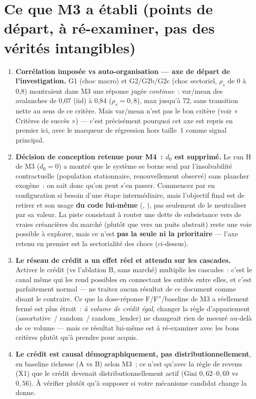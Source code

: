 \section*{Ce que M3 a établi (points de départ, à ré-examiner, pas des
vérités intangibles)}

\begin{enumerate}[leftmargin=*]

\item \textbf{Corrélation imposée vs auto-organisation — axe de départ de
  l'investigation.} G1 (choc macro) et G2/G2b/G2c (choc sectoriel, $\rho_s$
  de 0 à 0,8) montraient dans M3 une réponse jugée \emph{continue}~: var/mean
  des avalanches de 0,07 (iid) à 0,84 ($\rho_s{=}0{,}8$), max jusqu'à 72,
  sans transition nette au sens de ce critère. Mais var/mean n'est pas le
  bon critère (voir « Critères de succès ») — c'est précisément pourquoi cet
  axe est repris en premier ici, avec le marqueur de régression hors
  taille~1 comme signal principal.

\item \textbf{Décision de conception retenue pour M4~: $d_0$ est supprimé.}
  Le run H de M3 ($d_0{=}0$) a montré que le système se borne seul par
  l'insolvabilité contractuelle (population stationnaire, renouvellement
  observé) sans plancher exogène~: on sait donc qu'on peut s'en passer.
  Commencez par  en configuration si besoin d'une étape
  intermédiaire, mais l'objectif final est de retirer  et son
  usage \textbf{du code lui-même} (, ), pas seulement de le neutraliser par sa valeur. La piste
  consistant à router une dette de subsistance vers de vraies créancières du
  marché (plutôt que vers un puits abstrait) reste une voie possible à
  explorer, mais ce n'est \textbf{pas la seule ni la prioritaire} — l'axe
  retenu en premier est la sectorialité des chocs (ci-dessus).

\item \textbf{Le réseau de crédit a un effet réel et attendu sur les
  cascades.} Activer le crédit (vs l'ablation B, sans marché) multiplie les
  cascades~: c'est le canal même qui les rend possibles en connectant les
  entités entre elles, et c'est parfaitement normal — ne traitez aucun
  résultat de ce document comme disant le contraire. Ce que la dose-réponse
  F/F''/baseline de M3 a réellement fermé est plus étroit~: \emph{à volume
  de crédit égal}, changer la règle d'appariement (assortative~/ random~/
  random\_lender) ne changeait rien de mesuré au-delà de ce volume — mais ce
  résultat lui-même est à ré-examiner avec les bons critères plutôt qu'à
  prendre pour acquis.

\item \textbf{Le crédit est causal démographiquement, pas
  distributionnellement}, en baseline richesse (A vs B) selon M3~; ce n'est
  qu'avec la règle de revenu (X1) que le crédit devenait distributionnellement
  actif (Gini $0{,}62$--$0{,}69$ vs $0{,}56$). À vérifier plutôt qu'à
  supposer si votre mécanisme candidat change la donne.

\end{enumerate}

